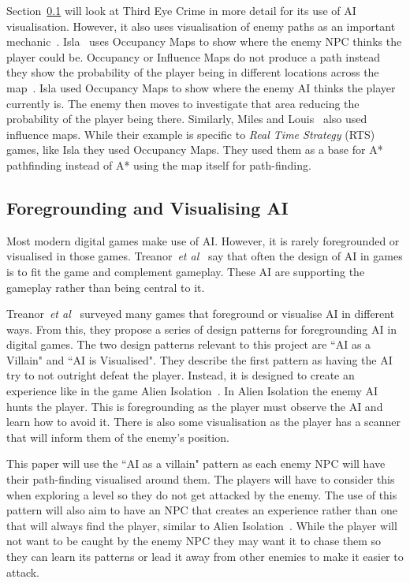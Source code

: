 \documentclass[journal]{IEEEtran}
\begin{document}
	Section~\ref{VisualisingAI} will look at Third Eye Crime in more detail for its use of AI visualisation. However, it also uses visualisation of enemy paths as an important mechanic~\cite{Isla2014, game:ThirdEyeCrime}.  Isla~\cite{Isla2014} uses Occupancy Maps to show where the enemy NPC thinks the player could be. Occupancy or Influence Maps do not produce a path instead they show the probability of the player being in different locations across the map~\cite{Isla2014, Miles2006}. Isla used Occupancy Maps to show where the enemy AI thinks the player currently is. The enemy then moves to investigate that area reducing the probability of the player being there.  Similarly, Miles and Louis~\cite{Miles2006} also used influence maps. While their example is specific to \textit{Real Time Strategy} (RTS) games, like Isla they used Occupancy Maps.  They used them as a base for A* pathfinding instead of A* using the map itself for path-finding.
	
	
	\subsection{Foregrounding and Visualising AI} \label{VisualisingAI}
	Most modern digital games make use of AI.  However, it is rarely foregrounded or visualised in those games. Treanor~\textit{et al}~\cite{treanor2015} say that often the design of AI in games is to fit the game and complement gameplay. These AI are supporting the gameplay rather than being central to it.
	
	Treanor~\textit{et al}~\cite{treanor2015} surveyed many games that foreground or visualise AI in different ways.   From this, they propose a series of design patterns for foregrounding AI in digital games. 
	The two design patterns relevant to this project are ``AI as a Villain" and ``AI is Visualised".  They describe the first pattern as having the AI try to not outright defeat the player. Instead, it is designed to create an experience like in the game Alien Isolation~\cite{treanor2015, game:AlienIsolation}.  In Alien Isolation the enemy AI hunts the player. This is foregrounding as the player must observe the AI and learn how to avoid it. There is also some visualisation as the player has a scanner that will inform them of the enemy's position. 
	
	This paper will use the ``AI as a villain" pattern as each enemy NPC will have their path-finding visualised around them. The players will have to consider this when exploring a level so they do not get attacked by the enemy. The use of this pattern will also aim to have an NPC that creates an experience rather than one that will always find the player, similar to Alien Isolation~\cite{game:AlienIsolation,treanor2015}. While the player will not want to be caught by the enemy NPC they may want it to chase them so they can learn its patterns or lead it away from other enemies to make it easier to attack. 
	
\end{document}
